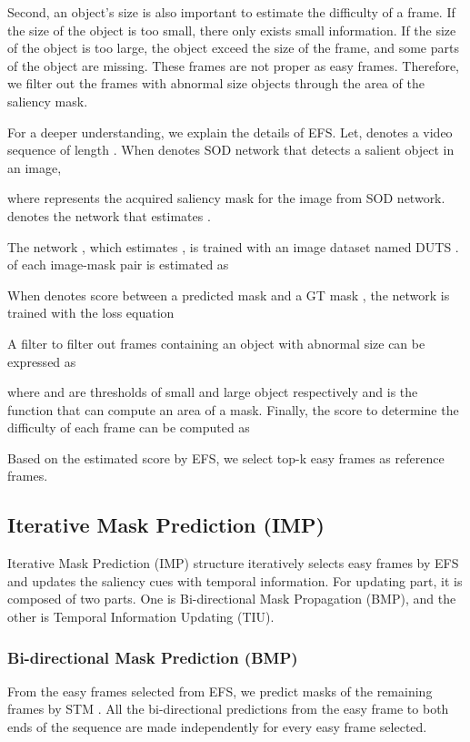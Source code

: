 \documentclass[letterpaper]{article} \usepackage{aaai22}  \usepackage{times}  \usepackage{helvet}  \usepackage{courier}  \usepackage[hyphens]{url}  \usepackage{graphicx} \urlstyle{rm} \def\UrlFont{\rm}  \usepackage{natbib}  \usepackage{caption} \DeclareCaptionStyle{ruled}{labelfont=normalfont,labelsep=colon,strut=off} \frenchspacing  \setlength{\pdfpagewidth}{8.5in}  \setlength{\pdfpageheight}{11in}  \usepackage{algorithm}
\begin{document}
Second, an object’s size is also important to estimate the difficulty of a frame. If the size of the object is too small, there only exists small information. If the size of the object is too large, the object exceed the size of the frame, and some parts of the object are missing. These frames are not proper as easy frames. Therefore, we filter out the frames with abnormal size objects through the area of the saliency mask. 

For a deeper understanding, we explain the details of EFS. Let,  denotes a video sequence of length . When  denotes SOD network that detects a salient object in an image, 

where  represents the acquired saliency mask for the image  from SOD network.  denotes the network that estimates .


The network , which estimates , is trained with an image dataset named DUTS \citep{wang2017learning}.  of each image-mask pair is estimated as 

When  denotes  score between a predicted mask  and a GT mask , the network  is trained with the loss equation

A filter  to filter out frames containing an object with abnormal size can be expressed as

where  and  are thresholds of small and large object respectively and  is the function that can compute an area of a mask. Finally, the score to determine the difficulty of each frame can be computed as

Based on the estimated score by EFS, we select top-k easy frames as reference frames.

\subsection{Iterative Mask Prediction (IMP)}

Iterative Mask Prediction (IMP) structure iteratively selects easy frames by EFS and updates the saliency cues with temporal information. For updating part, it is composed of two parts. One is Bi-directional Mask Propagation (BMP), and the other is Temporal Information Updating (TIU).

\subsubsection{Bi-directional Mask Prediction (BMP)}

From the easy frames selected from EFS, we predict masks of the remaining frames by STM \citep{oh2019video}. All the bi-directional predictions from the easy frame to both ends of the sequence are made independently for every easy frame selected. 
\end{document}
